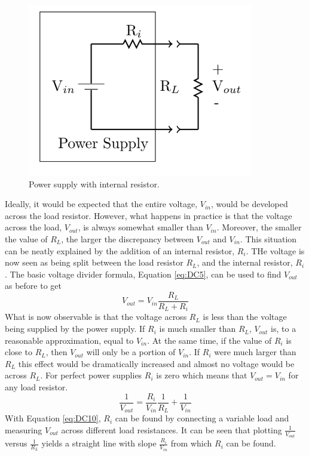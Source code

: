 \documentclass[12pt, a4paper, oneside, openright, titlepage]{book}
\begin{document}
\begin{figure}[H]
    \centering
    \includegraphics[scale = 0.8]{Images/DC8.PNG}
    \caption{Power supply with internal resistor.}
    \label{fig:DC8}
\end{figure}


Ideally, it would be expected that the entire voltage, $V_{in}$, would be developed across the load resistor. However, what happens in practice is that the voltage across the load, $V_{out}$, is always somewhat smaller than $V_{in}$. Moreover, the smaller the value of $R_L$, the larger the discrepancy between $V_{out}$ and $V_{in}$. This situation can be neatly explained by the addition of an internal resistor, $R_i$. THe voltage is now seen as being split between the load resistor $R_L$, and the internal resistor, $R_i$. The basic voltage divider formula, Equation \ref{eq:DC5}, can be used to find $V_{out}$ as before to get \begin{equation}\label{eq:DC9}
    V_{out} = V_{in}\frac{R_L}{R_L+R_i}
\end{equation}
What is now observable is that the voltage across $R_L$ is less than the voltage being supplied by the power supply. If $R_i$ is much smaller than $R_L$, $V_{out}$ is, to a reasonable approximation, equal to $V_{in}$. At the same time, if the value of $R_i$ is close to $R_L$, then $V_{out}$ will only be a portion of $V_{in}$. If $R_i$ were much larger than $R_L$ this effect would be dramatically increased and almost no voltage would be across $R_L$. For perfect power supplies $R_i$ is zero which means that $V_{out} = V_{in}$ for any load resistor. \begin{equation}\label{eq:DC10}
    \frac{1}{V_{out}} = \frac{R_i}{V_{in}}\frac{1}{R_L} + \frac{1}{V_{in}}
\end{equation}
With Equation \ref{eq:DC10}, $R_i$ can be found by connecting a variable load and measuring $V_{out}$ across different load resistances. It can be seen that plotting $\frac{1}{V_{out}}$ versus $\frac{1}{R_L}$ yields a straight line with slope $\frac{R_i}{V_{in}}$ from which $R_i$ can be found.
\end{document}
